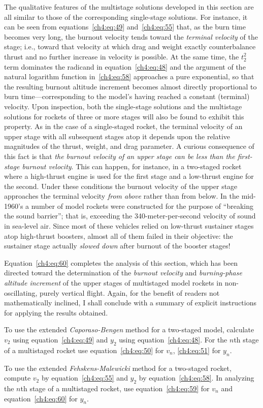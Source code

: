 The qualitative features of the multistage solutions developed in this section are all similar to
those of the corresponding single-stage solutions. For instance, it can be seen from
equations~\eqref{ch4:eq:49} and~\eqref{ch4:eq:55} that, as the burn time becomes very long, the
burnout velocity tends toward the \emph{terminal velocity} of the stage; i.e., toward that velocity
at which drag and weight exactly counterbalance thrust and no further increase in velocity is
possible. At the same time, the $t_2^{2}$ term dominates the radicand in equation~\eqref{ch4:eq:48}
and the argument of the natural logarithm function in~\eqref{ch4:eq:58} approaches a pure
exponential, so that the resulting burnout altitude increment becomes almost directly proportional
to burn time---corresponding to the model's having reached a constant (terminal) velocity. Upon
inspection, both the single-stage solutions and the multistage solutions for rockets of three or
more stages will also be found to exhibit this property. As in the case of a single-staged rocket,
the terminal velocity of an upper stage with all subsequent stages atop it depends upon the
relative magnitudes of the thrust, weight, and drag parameter. A curious consequence of this fact
is that \emph{the burnout velocity of an upper stage can be less than the first-stage burnout
velocity}. This can happen, for instance, in a two-staged rocket where a high-thrust engine is used
for the first stage and a low-thrust engine for the second. Under these conditions the burnout
velocity of the upper stage approaches the terminal velocity \emph{from above} rather than from
below. In the mid-1960's a number of model rockets were constructed for the purpose of ``breaking
the sound barrier''; that is, exceeding the 340-meter-per-second velocity of sound in sea-level
air. Since most of these vehicles relied on low-thrust sustainer stages atop high-thrust boosters,
almost all of them failed in their objective: the sustainer stage actually \emph{slowed down} after
burnout of the booster stages!

Equation~\eqref{ch4:eq:60} completes the analysis of this section, which has been directed toward
the determination of the \emph{burnout velocity} and \emph{burning-phase altitude increment} of the
upper stages of multistaged model rockets in non-oscillating, purely vertical flight. Again, for the
benefit of readers not mathematically inclined, I shall conclude with a summary of explicit
instructions for applying the results obtained.

To use the extended \emph{Caporaso-Bengen} method for a two-staged model, calculate $v_2$ using
equation~\eqref{ch4:eq:49} and $y_2$ using equation~\eqref{ch4:eq:48}. For the $n$th stage of a
multistaged rocket use equation~\eqref{ch4:eq:50} for $v_n$, \eqref{ch4:eq:51} for $y_n$.

To use the extended \emph{Fehskens-Malewicki} method for a two-staged rocket, compute $v_2$ by
equation~\eqref{ch4:eq:55} and $y_2$ by equation~\eqref{ch4:eq:58}. In analyzing the $n$th stage of
a multistaged rocket, use equation~\eqref{ch4:eq:59} for $v_n$ and equation~\eqref{ch4:eq:60} for
$y_n$.
